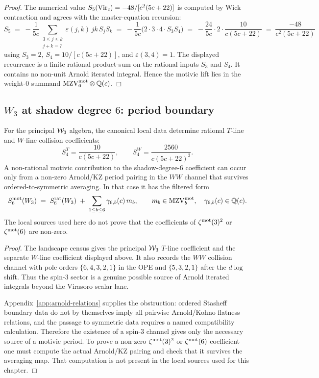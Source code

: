 \begin{proof}
The numerical value $S_5(\mathrm{Vir}_c) = -48/[c^2(5c+22)]$ is computed by
Wick contraction and agrees with the master-equation recursion:
\[
 S_5 \;=\; -\frac{1}{5c} \sum_{\substack{3 \leq j \leq k \\ j + k = 7}}
 \varepsilon(j, k)\, j k\, S_j S_k
 \;=\; -\frac{1}{5c}\bigl(2 \cdot 3 \cdot 4 \cdot S_3 S_4\bigr)
 \;=\; -\frac{24}{5c} \cdot 2 \cdot \frac{10}{c(5c+22)}
 \;=\; \frac{-48}{c^2(5c+22)}
\]
using $S_3 = 2$, $S_4 = 10/[c(5c+22)]$, and
$\varepsilon(3,4) = 1$.
The displayed recurrence is a finite rational product-sum on the
rational inputs $S_3$ and $S_4$. It contains no non-unit Arnold
iterated integral. Hence the motivic lift lies in the weight-$0$
summand $\mathrm{MZV}^{\mathrm{mot}}_0\otimes\mathbb Q(c)$.
\end{proof}

\subsection{$W_3$ at shadow degree $6$: period boundary}

\begin{proposition}
\ClaimStatusConditional
For the principal $\mathcal{W}_3$ algebra, the canonical local data determine
rational $T$-line and $W$-line collision coefficients:
\[
 S_4^T=\frac{10}{c(5c+22)},\qquad
 S_4^W=\frac{2560}{c(5c+22)^3}.
\]
A non-rational motivic contribution to the shadow-degree-$6$ coefficient
can occur only from a non-zero Arnold/KZ period pairing in the $WW$
channel that survives ordered-to-symmetric averaging. In that case it
has the filtered form
\[
 S_6^{\mathrm{mot}}(W_3)
 \;=\; S_6^{\mathrm{rat}}(W_3)
 \;+\;\sum_{1\le b\le 6}\gamma_{6,b}(c)\,m_b,
 \qquad
 m_b\in\mathrm{MZV}^{\mathrm{mot}}_b,\quad \gamma_{6,b}(c)\in\mathbb Q(c).
\]
The local sources used here do not prove that the coefficients of
$\zeta^{\mathrm{mot}}(3)^2$ or $\zeta^{\mathrm{mot}}(6)$ are non-zero.
\end{proposition}

\begin{proof}
The landscape census gives the principal $\mathcal{W}_3$ $T$-line coefficient
and the separate $W$-line coefficient displayed above. It also records
the $WW$ collision channel with pole orders $\{6,4,3,2,1\}$ in the
OPE and $\{5,3,2,1\}$ after the $d\log$ shift. Thus the spin-$3$
sector is a genuine possible source of Arnold iterated integrals beyond
the Virasoro scalar lane.

Appendix~\ref{app:arnold-relations} supplies the obstruction: ordered
Stasheff boundary data do not by themselves imply all pairwise
Arnold/Kohno flatness relations, and the passage to symmetric data
requires a named compatibility calculation. Therefore the existence of
a spin-$3$ channel gives only the necessary source of a motivic period.
To prove a non-zero $\zeta^{\mathrm{mot}}(3)^2$ or $\zeta^{\mathrm{mot}}(6)$ coefficient
one must compute the actual Arnold/KZ pairing and check that it survives
the averaging map. That computation is not present in the local sources
used for this chapter.
\end{proof}

